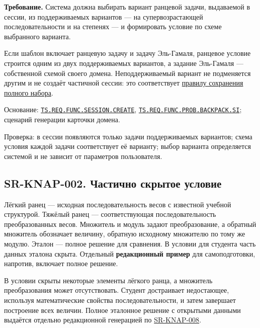 \documentclass[12pt,a4paper]{article}
\begin{document}
\textbf{Требование.} Система должна выбирать вариант ранцевой задачи, выдаваемой в сессии, из поддерживаемых вариантов --- на супервозрастающей последовательности и на степенях --- и формировать условие по схеме выбранного варианта.

Если шаблон включает ранцевую задачу и задачу Эль-Гамаля, ранцевое условие строится одним из двух поддерживаемых вариантов, а задание Эль-Гамаля --- собственной схемой своего домена. Неподдерживаемый вариант не подменяется другим и не создаёт частичной сессии: это соответствует {\href{../07\_Программные\_требования/DOC-06.2\_Сессии\_задач\_и\_планировщик.pdf\#swr-ses-005-сохранение-созданного-набора}{правилу сохранения полного набора}}.

Основание: {\href{../02\_Техническое\_задание/Техническое\_задание.pdf\#ts-req-func-session-create}{\texttt{TS.\allowbreak{}REQ.\allowbreak{}FUNC.\allowbreak{}SESSION.\allowbreak{}CREATE}}}, {\href{../02\_Техническое\_задание/Техническое\_задание.pdf\#ts-req-func-prob-backpack-si}{\texttt{TS.\allowbreak{}REQ.\allowbreak{}FUNC.\allowbreak{}PROB.\allowbreak{}BACKPACK.\allowbreak{}SI}}}; сценарий генерации карточки домена.

Проверка: в сессии появляются только задачи поддерживаемых вариантов; схема условия каждой задачи соответствует её варианту; выбор варианта определяется системой и не зависит от параметров пользователя.

\subsection{SR-KNAP-002. Частично скрытое условие}\label{sr-knap-002-ux447ux430ux441ux442ux438ux447ux43dux43e-ux441ux43aux440ux44bux442ux43eux435-ux443ux441ux43bux43eux432ux438ux435}

\hypertarget{sr-knap-002-частично-скрытое-условие}{}

\hypertarget{sr-knap-002}{}

Лёгкий ранец --- исходная последовательность весов с известной учебной структурой. Тяжёлый ранец --- соответствующая последовательность преобразованных весов. Множитель и модуль задают преобразование, а обратный множитель обозначает величину, обратную исходному множителю по тому же модулю. Эталон --- полное решение для сравнения. В условии для студента часть данных эталона скрыта. Отдельный \textbf{редакционный пример} для самоподготовки, напротив, включает полное решение.

В условии скрыты некоторые элементы лёгкого ранца, а множитель преобразования может отсутствовать. Студент достраивает недостающее, используя математические свойства последовательности, и затем завершает построение всех величин. Полное эталонное решение с открытыми данными выдаётся отдельно редакционной генерацией по {\hyperlink{sr-knap-008}{SR-KNAP-008}}.
\end{document}
